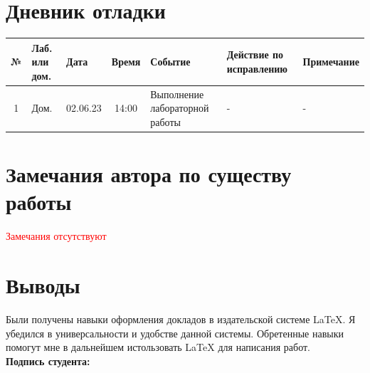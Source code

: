 \documentclass[12pt, letterpaper]{article}
\begin{document}
\section{Дневник отладки}
\begin{tabular}{|c|p{1cm}|p{1.5cm}|c|p{2.5cm}|p{2cm}|p{2.25cm}|}
    \hline
    № & Лаб. или дом. & Дата & Время & Событие & Действие по исправлению & Примечание\\
    \hline
    1 & Дом. & 02.06.23 & 14:00 & Выполнение лабораторной работы & - & -\\
    \hline
\end{tabular}
\section{Замечания автора по существу работы}
\textcolor{red}{Замечания отсутствуют}
\section{Выводы}
Были получены навыки оформления докладов в издательской системе \LaTeX{}. Я убедился в универсальности и удобстве данной системы. Обретенные навыки помогут мне в дальнейшем истользовать \LaTeX{} для написания работ. \\
\flushright \textbf{Подпись студента:} \underline{\hspace{3cm}}
\end{document}
